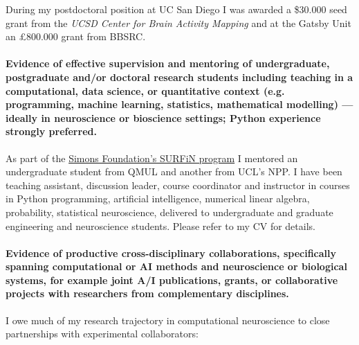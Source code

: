 \documentclass{article}
\begin{document}
During my postdoctoral position at UC San Diego I was awarded a \$30.000 seed
grant from the \emph{UCSD Center for Brain Activity Mapping} and at the Gatsby
Unit an £800.000 grant from BBSRC.

\paragraph{Evidence of effective supervision and mentoring of undergraduate,
postgraduate and/or doctoral research students including teaching in a
computational, data science, or quantitative context (e.g. programming,
machine learning, statistics, mathematical modelling) — ideally in neuroscience
or bioscience settings; Python experience strongly preferred.}

As part of the
\href{https://www.simonsfoundation.org/2021/09/09/inaugural-2021-scgb-undergraduate-research-fellowship-awardees-announced/}{Simons
Foundation's SURFiN program} I mentored an undergraduate student from QMUL and
another from UCL's NPP.
%
I have been teaching assistant, discussion leader, course coordinator and
instructor in courses in Python programming, artificial intelligence, numerical
linear algebra, probability, statistical neuroscience, delivered to
undergraduate and graduate engineering and neuroscience students. Please refer
to my CV for details.

\paragraph{Evidence of productive cross-disciplinary collaborations,
specifically spanning computational or AI methods and neuroscience or
biological systems, for example joint A/I publications, grants, or
collaborative projects with researchers from complementary disciplines.} 

I owe much of my research trajectory in computational neuroscience to close
partnerships with experimental collaborators:
\end{document}
